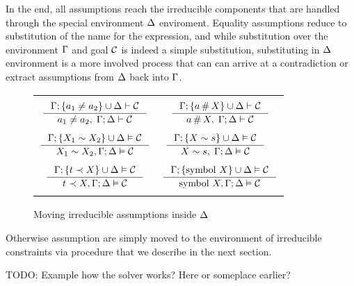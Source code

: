 \documentclass[english, mgr]{iithesis}
\newcommand{\solverRule}{\vdash}
\begin{document}
In the end, all assumptions reach the irreducible components that are handled through
the special environment $\Delta$ enviroment.
Equality assumptions reduce to substitution of the name for the expression,
and while substitution over the environment $\Gamma$ and goal $\mathcal{C}$ is indeed a simple substitution, substituting in $\Delta$ environment is a more involved process
that can can arrive at a contradiction or extract assumptions from $\Delta$ back into $\Gamma$.

\begin{figure}[hbtp]
  \centering
    \begin{tabularx}{\textwidth}{|CC|}
    \hline & \\ $
    \inference{
      \cEnv ; \{\atomv_1 \cneq \atomv_2\} \cup \icEnv \solverRule \sconstr
    }{
      \atomv_1 \cneq \atomv_2, \; \cEnv ; \icEnv \solverRule \sconstr
    }
    $ & $
    \inference{
      \cEnv ; \{\atomv \cfresh \termv\} \cup \icEnv \solverRule \sconstr
    }{
      \atomv \cfresh \termv, \; \cEnv ; \icEnv \solverRule \sconstr
    }
    $ \\ & \\ $
    \inference{
      \cEnv ; \{\termv_1 \csheq \termv_2\} \cup \icEnv \vDash \sconstr
    }{
      \termv_1 \csheq \termv_2, \cEnv ; \icEnv \vDash \sconstr
    }
    $ & $
    \inference{
      \cEnv ; \{\termv \csheq \shape\} \cup \icEnv \vDash \sconstr
    }{
      \termv \csheq \shape,\; \cEnv ; \icEnv \vDash \sconstr
    }
    \quad
    $ \\ & \\ $
    \inference{
      \cEnv ; \{\term \cshlt \termv\} \cup \icEnv \vDash \sconstr
    }{
      \term \cshlt \termv, \cEnv ; \icEnv \vDash \sconstr
    }
    $ & $
    \inference{
      \cEnv ; \{\csymb \termv\} \cup \icEnv \vDash \sconstr
    }{
      \csymb \termv, \cEnv ; \icEnv \vDash \sconstr
    }
    $ \\ & \\ \hline
    \end{tabularx}
  \caption{Moving irreducible assumptions inside $\Delta$}
  \label{fig:assumption-equality-rules}
\end{figure}
Otherwise assumption are simply moved to the environment of irreducible
constraints via procedure that we describe in the next section.

TODO: Example how the solver works? Here or someplace earlier?

\newpage
\end{document}
